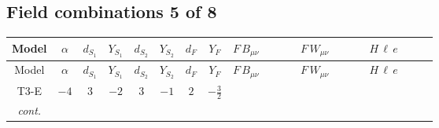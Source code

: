 \documentclass[8pt]{article}
\begin{document}
\begin{landscape}
\subsection*{Field combinations 5 of 8}
\begin{longtable}{@{}cccccccc >{\raggedright\arraybackslash}p{0.21\linewidth} >{\raggedright\arraybackslash}p{0.21\linewidth} >{\raggedright\arraybackslash}p{0.21\linewidth}@{}}
\toprule
Model & $\alpha$ & $d_{S_1}$ & $Y_{S_1}$ & $d_{S_2}$ & $Y_{S_2}$ & $d_F$ & $Y_F$ & $F\,B_{\mu\nu}$ & $F\,W_{\mu\nu}$ & $H\,\ell\,e$ \\
\midrule
\endfirsthead
\toprule
Model & $\alpha$ & $d_{S_1}$ & $Y_{S_1}$ & $d_{S_2}$ & $Y_{S_2}$ & $d_F$ & $Y_F$ & $F\,B_{\mu\nu}$ & $F\,W_{\mu\nu}$ & $H\,\ell\,e$ \\
\midrule
\endhead
T3-E & $-4$ & $3$ & $-2$ & $3$ & $-1$ & $2$ & $-\frac{3}{2}$ & \scriptsize\adjustbox{max width=\linewidth}{$\begin{gathered} -\frac{9}{2} \hbar  \log \left(\frac{\bar{\mu}^{2}}{M_F^2}\right) B_{\mu _1\mu _2}^2\end{gathered}$} & \scriptsize\adjustbox{max width=\linewidth}{$\begin{gathered} -\frac{1}{2} \hbar  \log \left(\frac{\bar{\mu}^{2}}{M_F^2}\right) \left(W_{\mu _1\mu _2}^{A_1}\right){}^2\end{gathered}$} & \scriptsize\adjustbox{max width=\linewidth}{$\begin{gathered} +\frac{\sqrt{3} \hbar  \overline{y_{1,i_3,r_1}} \overline{L_{a_1,i_2}}\, P_R\, e_{i_1} H_{a_1} y_{1,i_2,r_1} Y_{e,i_3,i_1}}{4 \epsilon } \\ +\frac{3}{8} \sqrt{3} \hbar  \overline{y_{1,i_3,r_1}} \overline{L_{a_1,i_2}}\, P_R\, e_{i_1} H_{a_1} y_{1,i_2,r_1} Y_{e,i_3,i_1} \\ +\frac{\sqrt{3} \hbar  \overline{y_{2,i_3,r_1}} \overline{L_{a_1,i_2}}\, P_R\, e_{i_1} H_{a_1} y_{2,i_2,r_1} Y_{e,i_3,i_1}}{4 \epsilon }\end{gathered}$} \\
\textit{cont.} &  &  &  &  &  &  &  &  &  & \scriptsize\adjustbox{max width=\linewidth}{$\begin{gathered} +\frac{3}{8} \sqrt{3} \hbar  \overline{y_{2,i_3,r_1}} \overline{L_{a_1,i_2}}\, P_R\, e_{i_1} H_{a_1} y_{2,i_2,r_1} Y_{e,i_3,i_1} \\ +\frac{\sqrt{3} \hbar  \overline{y_{1,i_1,r_1}} \overline{Y_{e,i_3,i_2}} \overline{e_{i_2}}\, P_L\, L_{a_1,i_1} y_{1,i_3,r_1} H_{a_1}{}^{\dagger }}{4 \epsilon } \\ +\frac{3}{8} \sqrt{3} \hbar  \overline{y_{1,i_1,r_1}} \overline{Y_{e,i_3,i_2}} \overline{e_{i_2}}\, P_L\, L_{a_1,i_1} y_{1,i_3,r_1} H_{a_1}{}^{\dagger }\end{gathered}$} \\

\end{longtable}
\end{landscape}
\end{document}
